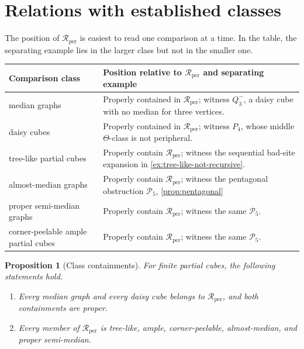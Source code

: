 \documentclass[11pt]{article}
\newtheorem{proposition}[theorem]{Proposition}
\theoremstyle{definition}
\theoremstyle{remark}
\newcommand{\Rper}{\mathcal R_{\mathrm{per}}}
\begin{document}


\section{Relations with established classes}
\label{sec:position}

The position of \(\Rper\) is easiest to read one comparison at a time.  In
the table, the separating example lies in the larger class but not in the
smaller one.

\begin{center}
\small
\begin{tabular}{@{}p{}p{}@{}}
\toprule
Comparison class & Position relative to \(\Rper\) and separating example \\
\midrule
median graphs & Properly contained in \(\Rper\); witness \(Q_3^-\), a
  daisy cube with no median for three vertices. \\
daisy cubes & Properly contained in \(\Rper\); witness \(P_4\), whose
  middle \(\Theta\)-class is not peripheral. \\
tree-like partial cubes & Properly contain \(\Rper\); witness the
  sequential bad-site expansion in \cref{ex:tree-like-not-recursive}. \\
almost-median graphs & Properly contain \(\Rper\); witness the pentagonal
  obstruction \(\mathcal P_5\),
    \cref{prop:pentagonal} \\
proper semi-median graphs & Properly contain \(\Rper\); witness the same
  \(\mathcal P_5\). \\
corner-peelable ample partial cubes & Properly contain \(\Rper\); witness
  the same \(\mathcal P_5\). \\
\bottomrule
\end{tabular}
\end{center}

\begin{proposition}[Class containments]
\label{prop:position}
For finite partial cubes, the following statements hold.
\begin{enumerate}[label=\textup{(\roman*)}]
  \item Every median graph and every daisy cube belongs to \(\Rper\), and
        both containments are proper.
  \item Every member of \(\Rper\) is tree-like, ample, corner-peelable,
        almost-median, and proper semi-median.
\end{enumerate}
\end{proposition}
\end{document}
